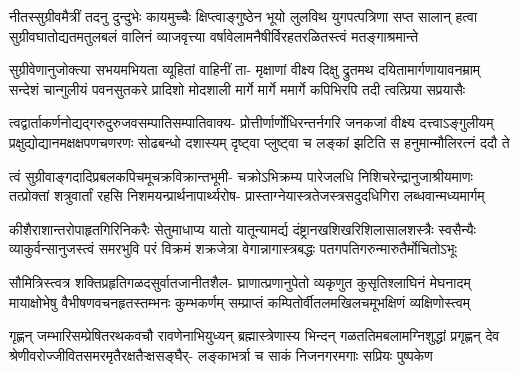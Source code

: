 
\translink{}

\storymeta


\fourlineindentedshloka
{नीतस्सुग्रीवमैत्रीं तदनु दुन्दुभेः कायमुच्चैः}
{क्षिप्त्वाङ्गुष्ठेन भूयो लुलविथ युगपत्पत्रिणा सप्त सालान्}
{हत्वा सुग्रीवघातोद्यतमतुलबलं वालिनं व्याजवृत्त्या}
{वर्षावेलामनैषीर्विरहतरळितस्त्वं मतङ्गाश्रमान्ते} %

\fourlineindentedshloka
{सुग्रीवेणानुजोक्त्या सभयमभियता व्यूहितां वाहिनीं ता-}
{मृक्षाणां वीक्ष्य दिक्षु द्रुतमथ दयितामार्गणायावनम्राम्}
{सन्देशं चान्गुलीयं पवनसुतकरे प्रादिशो मोदशाली}
{मार्गे मार्गे ममार्गे कपिभिरपि तदी त्वत्प्रिया सप्रयासैः} %

\fourlineindentedshloka
{त्वद्वार्ताकर्णनोद्यद्गरुदुरुजवसम्पातिसम्पातिवाक्य-}
{प्रोत्तीर्णार्णोधिरन्तर्नगरि जनकजां वीक्ष्य दत्त्वाऽङ्गुलीयम्}
{प्रक्षुद्योद्यानमक्षक्षपणचणरणः सोढबन्धो दशास्यम्}
{दृष्ट्वा प्लुष्ट्वा च लङ्कां झटिति स हनुमान्मौलिरत्नं ददौ ते} %

\fourlineindentedshloka
{त्वं सुग्रीवाङ्गदादिप्रबलकपिचमूचक्रविक्रान्तभूमी-}
{चक्रोऽभिक्रम्य पारेजलधि निशिचरेन्द्रानुजाश्रीयमाणः}
{तत्प्रोक्तां शत्रुवार्तां रहसि निशमयन्प्रार्थनापार्थ्यरोष-}
{प्रास्ताग्नेयास्त्रतेजस्त्रसदुदधिगिरा लब्धवान्मध्यमार्गम्} %

\fourlineindentedshloka
{कीशैराशान्तरोपाहृतगिरिनिकरैः सेतुमाधाप्य यातो}
{यातून्यामर्द्य दंष्ट्रानखशिखरिशिलासालशस्त्रैः स्वसैन्यैः}
{व्याकुर्वन्सानुजस्त्वं समरभुवि परं विक्रमं शक्रजेत्रा}
{वेगान्नागास्त्रबद्धः पतगपतिगरुन्मारुतैर्मोचितोऽभूः} %

\fourlineindentedshloka
{सौमित्रिस्त्वत्र शक्तिप्रहृतिगळदसुर्वातजानीतशैल-}
{घ्राणात्प्रणानुपेतो व्यकृणुत कुसृतिश्लाघिनं मेघनादम्}
{मायाक्षोभेषु वैभीषणवचनहृतस्तम्भनः कुम्भकर्णम्}
{सम्प्राप्तं कम्पितोर्वीतलमखिलचमूभक्षिणं व्यक्षिणोस्त्वम्} %

\fourlineindentedshloka
{गृह्णन् जम्भारिसम्प्रेषितरथकवचौ रावणेनाभियुध्यन्}
{ब्रह्मास्त्रेणास्य भिन्दन् गळततिमबलामग्निशुद्धां प्रगृह्णन्}
{देव श्रेणीवरोज्जीवितसमरमृतैरक्षतैऱ्क्षसङ्घैर्-}
{लङ्काभर्त्रा च साकं निजनगरमगाः सप्रियः पुष्पकेण} %

